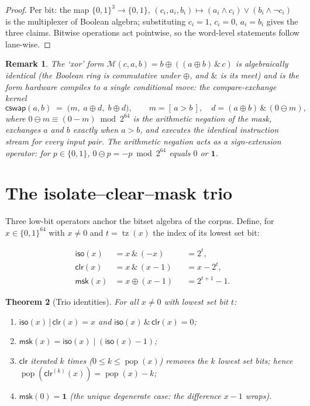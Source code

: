\documentclass[11pt,a4paper]{report}
\newtheorem{theorem}{Theorem}[chapter]
\newtheorem{remark}[theorem]{Remark}
\newcommand{\mask}{\mathcal{M}}
\newcommand{\ones}{\mathbf{1}}
\newcommand{\sel}[1]{\left[\,#1\,\right]}
\DeclareMathOperator{\pop}{pop}
\DeclareMathOperator{\tz}{tz}
\begin{document}
\begin{proof}
Per bit: the map $\{0,1\}^3 \to \{0,1\}$,
$(c_i, a_i, b_i) \mapsto (a_i \wedge c_i) \vee (b_i \wedge \neg c_i)$ is
the multiplexer of Boolean algebra; substituting $c_i = 1$, $c_i = 0$,
$a_i = b_i$ gives the three claims. Bitwise operations act pointwise,
so the word-level statements follow lane-wise.
\end{proof}

\begin{remark}
The `xor' form $\mask(c,a,b) = b \mathbin{\oplus} ((a \oplus b)\,\&\,c)$
is algebraically identical (the Boolean ring is commutative under
$\oplus$, and $\&$ is its meet) and is the form hardware compiles to a
single conditional move: the compare-exchange kernel
\begin{equation}
\mathsf{cswap}(a,b) \;=\; \bigl(m,\; a \oplus d,\; b \oplus d\bigr),
\qquad
m = \sel{a > b},\quad d = (a \oplus b)\,\&\, (0 \ominus m),
\end{equation}
where $0 \ominus m \equiv (0 - m) \bmod 2^{64}$ is the arithmetic
negation of the mask, exchanges $a$ and $b$ exactly when $a > b$, and
executes the identical instruction stream for every input pair. The
arithmetic negation acts as a \emph{sign-extension operator}: for
$p \in \{0,1\}$, $0 \ominus p = -p \bmod 2^{64}$ equals $0$ or $\ones$.
\end{remark}

\section{The isolate--clear--mask trio}

Three low-bit operators anchor the bitset algebra of the corpus. Define,
for $x \in \{0,1\}^{64}$ with $x \neq 0$ and $t = \tz(x)$ the index of
its lowest set bit:

\begin{align}
\mathsf{iso}(x)   &= x \,\&\, (-x)  &&= 2^{t}, \label{eq:blsi}\\
\mathsf{clr}(x)   &= x \,\&\, (x-1) &&= x - 2^{t}, \label{eq:blsr}\\
\mathsf{msk}(x)   &= x \oplus (x-1) &&= 2^{t+1} - 1. \label{eq:blsmsk}
\end{align}

\begin{theorem}[Trio identities]\label{thm:trio}
For all $x \neq 0$ with lowest set bit $t$:
\begin{enumerate}
\item $\mathsf{iso}(x) \,|\, \mathsf{clr}(x) = x$ and
      $\mathsf{iso}(x) \,\&\, \mathsf{clr}(x) = 0$;
\item $\mathsf{msk}(x) = \mathsf{iso}(x)\;|\;(\mathsf{iso}(x)-1)$;
\item $\mathsf{clr}$ iterated $k$ times ($0 \le k \le \pop(x)$)
      removes the $k$ lowest set bits; hence
      $\pop(\mathsf{clr}^{(k)}(x)) = \pop(x) - k$;
\item $\mathsf{msk}(0) = \ones$ (the unique degenerate case: the
      difference $x - 1$ wraps).
\end{enumerate}
\end{theorem}
\end{document}
